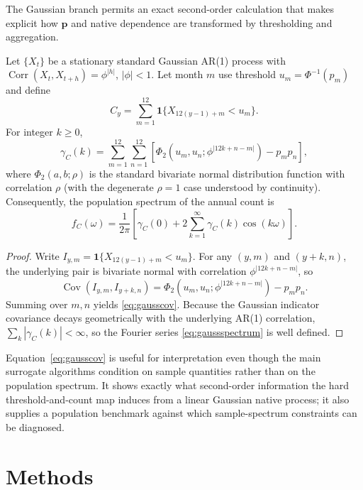 The Gaussian branch permits an exact second-order calculation that makes explicit how $\mathbf p$ and native dependence are transformed by thresholding and aggregation.

\begin{proposition}\label{prop:gausscov}
Let $\{X_t\}$ be a stationary standard Gaussian AR(1) process with $\operatorname{Corr}(X_t,X_{t+h})=\phi^{|h|}$, $|\phi|<1$. Let month $m$ use threshold $u_m=\Phi^{-1}(p_m)$ and define
\[
C_y=\sum_{m=1}^{12}\mathbf 1\{X_{12(y-1)+m}<u_m\}.
\]
For integer $k\ge0$,
\begin{equation}
\gamma_C(k)
=
\sum_{m=1}^{12}\sum_{n=1}^{12}
\left[
\Phi_2\!\left(u_m,u_n;\phi^{|12k+n-m|}\right)-p_mp_n
\right],
\label{eq:gausscov}
\end{equation}
where $\Phi_2(a,b;\rho)$ is the standard bivariate normal distribution function with correlation $\rho$ (with the degenerate $\rho=1$ case understood by continuity). Consequently, the population spectrum of the annual count is
\begin{equation}
f_C(\omega)=\frac{1}{2\pi}\left[\gamma_C(0)+2\sum_{k=1}^{\infty}\gamma_C(k)\cos(k\omega)\right].
\label{eq:gaussspectrum}
\end{equation}
\end{proposition}

\begin{proof}
Write $I_{y,m}=\mathbf 1\{X_{12(y-1)+m}<u_m\}$. For any $(y,m)$ and $(y+k,n)$, the underlying pair is bivariate normal with correlation $\phi^{|12k+n-m|}$, so
\[
\operatorname{Cov}(I_{y,m},I_{y+k,n})
=\Phi_2(u_m,u_n;\phi^{|12k+n-m|})-p_mp_n.
\]
Summing over $m,n$ yields \eqref{eq:gausscov}. Because the Gaussian indicator covariance decays geometrically with the underlying AR(1) correlation, $\sum_k|\gamma_C(k)|<\infty$, so the Fourier series \eqref{eq:gaussspectrum} is well defined.
\end{proof}

Equation~\eqref{eq:gausscov} is useful for interpretation even though the main surrogate algorithms condition on sample quantities rather than on the population spectrum. It shows exactly what second-order information the hard threshold-and-count map induces from a linear Gaussian native process; it also supplies a population benchmark against which sample-spectrum constraints can be diagnosed.

\section{Methods}\label{sec:methods}

